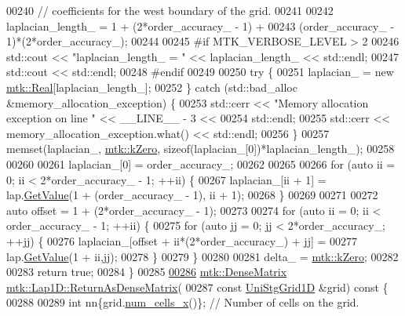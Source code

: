 \begin{DoxyCode}
00240   \textcolor{comment}{// coefficients for the west boundary of the grid.}
00241 
00242   laplacian\_length\_ = 1 + (2*order\_accuracy\_ - 1) +
00243     (order\_accuracy\_ - 1)*(2*order\_accuracy\_);
00244 
00245 \textcolor{preprocessor}{  #if MTK\_VERBOSE\_LEVEL > 2}
00246   std::cout << \textcolor{stringliteral}{"laplacian\_length\_ = "} << laplacian\_length\_ << std::endl;
00247   std::cout << std::endl;
00248 \textcolor{preprocessor}{  #endif}
00249 
00250   \textcolor{keywordflow}{try} \{
00251     laplacian\_ = \textcolor{keyword}{new} \hyperlink{group__c01-roots_gac080bbbf5cbb5502c9f00405f894857d}{mtk::Real}[laplacian\_length\_];
00252   \} \textcolor{keywordflow}{catch} (std::bad\_alloc &memory\_allocation\_exception) \{
00253     std::cerr << \textcolor{stringliteral}{"Memory allocation exception on line "} << \_\_LINE\_\_ - 3 <<
00254       std::endl;
00255     std::cerr << memory\_allocation\_exception.what() << std::endl;
00256   \}
00257   memset(laplacian\_, \hyperlink{group__c01-roots_ga59a451a5fae30d59649bcda274fea271}{mtk::kZero}, \textcolor{keyword}{sizeof}(laplacian\_[0])*laplacian\_length\_);
00258 
00260 
00261   laplacian\_[0] = order\_accuracy\_;
00262 
00265 
00266   \textcolor{keywordflow}{for} (\textcolor{keyword}{auto} ii = 0; ii < 2*order\_accuracy\_ - 1; ++ii) \{
00267     laplacian\_[ii + 1] = lap.\hyperlink{classmtk_1_1DenseMatrix_a4b23ecbebd970b5eea915dbb50691024}{GetValue}(1 + (order\_accuracy\_ - 1), ii + 1);
00268   \}
00269 
00271 
00272   \textcolor{keyword}{auto} offset = 1 + (2*order\_accuracy\_ - 1);
00273 
00274   \textcolor{keywordflow}{for} (\textcolor{keyword}{auto} ii = 0; ii < order\_accuracy\_ - 1; ++ii) \{
00275     \textcolor{keywordflow}{for} (\textcolor{keyword}{auto} jj = 0; jj < 2*order\_accuracy\_; ++jj) \{
00276       laplacian\_[offset + ii*(2*order\_accuracy\_) + jj] =
00277         lap.\hyperlink{classmtk_1_1DenseMatrix_a4b23ecbebd970b5eea915dbb50691024}{GetValue}(1 + ii,jj);
00278     \}
00279   \}
00280 
00281   delta\_ = \hyperlink{group__c01-roots_ga59a451a5fae30d59649bcda274fea271}{mtk::kZero};
00282 
00283   \textcolor{keywordflow}{return} \textcolor{keyword}{true};
00284 \}
00285 
\hypertarget{mtk__lap__1d_8cc_source_l00286}{}\hyperlink{classmtk_1_1Lap1D_aaea34a17b0879e05eb4109645a2ba8f4}{00286} \hyperlink{classmtk_1_1DenseMatrix}{mtk::DenseMatrix} \hyperlink{classmtk_1_1Lap1D_aaea34a17b0879e05eb4109645a2ba8f4}{mtk::Lap1D::ReturnAsDenseMatrix}(
00287   \textcolor{keyword}{const} \hyperlink{classmtk_1_1UniStgGrid1D}{UniStgGrid1D} &grid)\textcolor{keyword}{ const }\{
00288 
00289   \textcolor{keywordtype}{int} nn\{grid.\hyperlink{classmtk_1_1UniStgGrid1D_af1b3729d8afa07be5b2775ed68015b80}{num\_cells\_x}()\};  \textcolor{comment}{// Number of cells on the grid.}

\end{DoxyCode}
